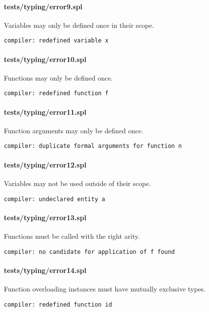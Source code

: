 \documentclass[a4paper]{article}
\begin{document}
\paragraph{tests/typing/error9.spl} Variables may only be defined once in their scope.
    \begin{verbatim}
compiler: redefined variable x
    \end{verbatim}

\paragraph{tests/typing/error10.spl} Functions may only be defined once.
    \begin{verbatim}
compiler: redefined function f
    \end{verbatim}

\paragraph{tests/typing/error11.spl} Function arguments may only be defined once.
    \begin{verbatim}
compiler: duplicate formal arguments for function n
    \end{verbatim}

\paragraph{tests/typing/error12.spl} Variables may not be used outside of their scope.
    \begin{verbatim}
compiler: undeclared entity a
    \end{verbatim}

\paragraph{tests/typing/error13.spl} Functions must be called with the right arity.
    \begin{verbatim}
compiler: no candidate for application of f found
    \end{verbatim}

\paragraph{tests/typing/error14.spl} Function overloading instances must have mutually exclusive types.
    \begin{verbatim}
compiler: redefined function id
    \end{verbatim}
\end{document}
